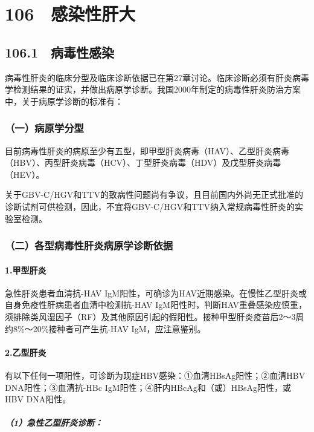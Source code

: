 \protect\hypertarget{text00239.html}{}{}

\section{106　感染性肝大}

\subsection{106.1　病毒性感染}

病毒性肝炎的临床分型及临床诊断依据已在第27章讨论。临床诊断必须有肝炎病毒学检测结果的证实，并做出病原学诊断。我国2000年制定的病毒性肝炎防治方案中，关于病原学诊断的标准有：

\subsubsection{（一）病原学分型}

目前病毒性肝炎的病原至少有五型，即甲型肝炎病毒（HAV）、乙型肝炎病毒（HBV）、丙型肝炎病毒（HCV）、丁型肝炎病毒（HDV）及戊型肝炎病毒（HEV）。

关于GBV-C/HGV和TTV的致病性问题尚有争议，且目前国内外尚无正式批准的诊断试剂可供检测，因此，不宜将GBV-C/HGV和TTV纳入常规病毒性肝炎的实验室检测。

\subsubsection{（二）各型病毒性肝炎病原学诊断依据}

\paragraph{1.甲型肝炎}

急性肝炎患者血清抗-HAV
IgM阳性，可确诊为HAV近期感染。在慢性乙型肝炎或自身免疫性肝病患者血清中检测抗-HAV
IgM阳性时，判断HAV重叠感染应慎重，须排除类风湿因子（RF）及其他原因引起的假阳性。接种甲型肝炎疫苗后2～3周约8\%～20\%接种者可产生抗-HAV
IgM，应注意鉴别。

\paragraph{2.乙型肝炎}

有以下任何一项阳性，可诊断为现症HBV感染：①血清HBsAg阳性；②血清HBV
DNA阳性；③血清抗-HBc IgM阳性；④肝内HBcAg和（或）HBsAg阳性，或HBV
DNA阳性。

\subparagraph{（1）急性乙型肝炎诊断：}

